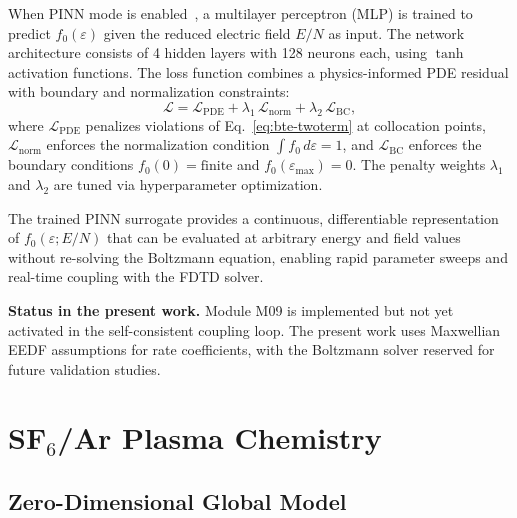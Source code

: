 \documentclass[11pt,a4paper]{report}
\begin{document}
When PINN mode is enabled~\cite{Raissi2019,Kim2023}, a multilayer perceptron (MLP) is trained to predict $f_0(\varepsilon)$ given the reduced electric field $E/N$ as input.  The network architecture consists of 4 hidden layers with 128 neurons each, using $\tanh$ activation functions.  The loss function combines a physics-informed PDE residual with boundary and normalization constraints:
\begin{equation}
  \mathcal{L} = \mathcal{L}_\mathrm{PDE}
              + \lambda_1\,\mathcal{L}_\mathrm{norm}
              + \lambda_2\,\mathcal{L}_\mathrm{BC},
  \label{eq:pinn-loss}
\end{equation}
where $\mathcal{L}_\mathrm{PDE}$ penalizes violations of Eq.~\eqref{eq:bte-twoterm} at collocation points, $\mathcal{L}_\mathrm{norm}$ enforces the normalization condition $\int f_0\,d\varepsilon = 1$, and $\mathcal{L}_\mathrm{BC}$ enforces the boundary conditions $f_0(0) = \mathrm{finite}$ and $f_0(\varepsilon_\mathrm{max}) = 0$.  The penalty weights $\lambda_1$ and $\lambda_2$ are tuned via hyperparameter optimization.

The trained PINN surrogate provides a continuous, differentiable representation of $f_0(\varepsilon; E/N)$ that can be evaluated at arbitrary energy and field values without re-solving the Boltzmann equation, enabling rapid parameter sweeps and real-time coupling with the FDTD solver.

\textbf{Status in the present work.}  Module M09 is implemented but not yet activated in the self-consistent coupling loop.  The present work uses Maxwellian EEDF assumptions for rate coefficients, with the Boltzmann solver reserved for future validation studies.


\newpage
\chapter{SF$_6$/Ar Plasma Chemistry}
\label{part:chemistry}


\section{Zero-Dimensional Global Model}
\label{sec:0d-model}
\end{document}
